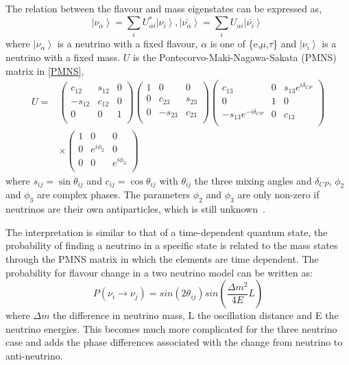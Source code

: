 The relation between the flavour and mass eigenstates can be expressed as,
\begin{equation}
 \left| \nu_\alpha \right\rangle = \sum_{i} U^{*}_{\alpha i} \left| \nu_i \right\rangle,
 \left| \bar{\nu_\alpha} \right\rangle = \sum_{i} U_{\alpha i} \left| \bar{\nu_i} \right\rangle\
 \end{equation}
where
 $\left| \nu_\alpha \right\rangle $ is a neutrino with a fixed flavour, $\alpha$ is one of \{e,$\mu$,$\tau$\} and  $\left| \nu_i \right\rangle$ is a neutrino with a fixed mass.
$U$ is the Pontecorvo-Maki-Nagawa-Sakata (PMNS) matrix in \eqref{PMNS},
\begin{equation}
\label{PMNS}
\begin{aligned}
U ={} & 
 \begin{pmatrix}
 c_{12} & s_{12} & 0\\
  -s_{12} & c_{12} & 0\\
  0 & 0 & 1\\
 \end{pmatrix} 
  \begin{pmatrix}
 1 & 0 & 0\\
  0 & c_{23} & s_{23}\\
  0 & -s_{23} & c_{23}\\
 \end{pmatrix} 
   \begin{pmatrix}
 c_{13} & 0 & s_{13}e^{i\delta_{CP}}\\
  0 & 1 & 0\\
  -s_{13}e^{-i\delta_{CP}} & 0 & c_{13}\\
 \end{pmatrix} 
 \\
 & \times
  \begin{pmatrix}
1 & 0& 0\\
  0 & e^{i\phi_2} & 0\\
  0 & 0 & e^{i\phi_3}\\
 \end{pmatrix} 
 \end{aligned}
\end{equation}
where $s_{ij} = \sin\theta_{ij}$ and $c_{ij} = \cos\theta_{ij}$ with $\theta_{ij}$ the three mixing angles and $\delta_{CP}$, $\phi_2$ and $\phi_3$ are complex phases. The parameters $\phi_2$ and $\phi_3$ are only non-zero if neutrinos are their own antiparticles, which is still unknown~\cite{13PDG}.

The interpretation is similar to that of a time-dependent quantum state, the probability of finding a neutrino in a specific state is related to the mass states through the PMNS matrix in which the elements are time dependent. The probability for flavour change in a two neutrino model can be written as:
\begin{equation}
P(\nu_i \rightarrow \nu_j) = sin(2\theta_{ij})sin(\frac{\Delta m^2}{4E} L)
\end{equation}
where $\Delta m$ the difference in neutrino mass, L the oscillation distance and E the neutrino energies. This becomes much more complicated for the three neutrino case and adds the phase differences associated with the change from neutrino to anti-neutrino.

